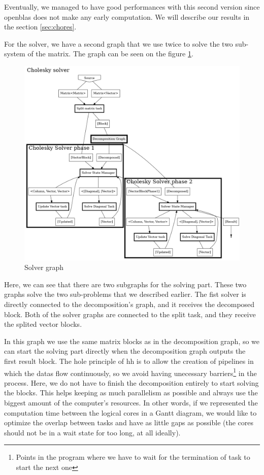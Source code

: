 Eventually, we managed to have good performances with this second version since
openblas does not make any early computation. We will describe our results in
the section \ref{sec:chores}.

For the solver, we have a second graph that we use twice to solve the two
sub-system of the matrix. The graph can be seen on the figure
\ref{fig:solvergraph}.

\begin{figure}[!ht]
  \begin{center}
    \includegraphics[scale=0.2]{img/cho-img/solver_graph.png}
    \caption{Solver graph}
    \label{fig:solvergraph}
  \end{center}
\end{figure}

Here, we can see that there are two subgraphs for the solving part. These two
graphs solve the two sub-problems that we described earlier. The fist solver is
directly connected to the decomposition's graph, and it receives the decomposed
block. Both of the solver graphs are connected to the split task, and they
receive the splited vector blocks.

In this graph we use the same matrix blocks as in the decomposition graph, so we
can start the solving part directly when the decomposition graph outputs the
first result block. The hole principle of \gls{hh} is to allow the creation of
pipelines in which the datas flow continuously, so we avoid having unecessary
barriers\footnote{Points in the program where we have to wait for the
termination of task to start the next one} in the process. Here, we do not have
to finish the decomposition entirely to start solving the blocks. This helps
keeping as much parallelism as possible and always use the biggest amount of the
computer's resources. In other words, if we represented the computation time
between the logical cores in a Gantt diagram, we would like to optimize the
overlap between tasks and have as little gaps as possible (the cores should not
be in a wait state for too long, at all ideally).


